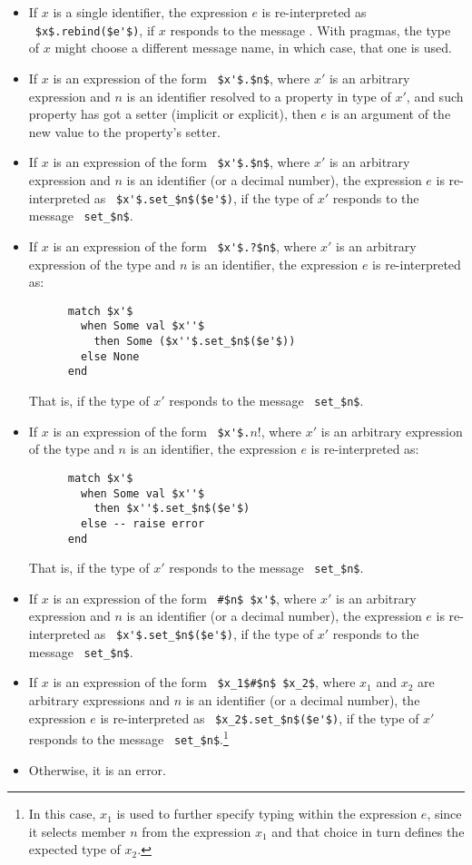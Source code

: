 \begin{itemize}
  \item If $x$ is a single identifier, the expression $e$ is re-interpreted as ~\lstinline!$x$.rebind($e'$)!, if $x$ responds to the message . With pragmas, the type of $x$ might choose a different message name, in which case, that one is used.
  \item If $x$ is an expression of the form ~\lstinline!$x'$.$n$!, where $x'$ is an arbitrary expression and $n$ is an identifier resolved to a property in type of $x'$, and such property has got a setter (implicit or explicit), then $e$ is an argument of the new value to the property's setter.
  \item If $x$ is an expression of the form ~\lstinline!$x'$.$n$!, where $x'$ is an arbitrary expression and $n$ is an identifier (or a decimal number), the expression $e$ is re-interpreted as ~\lstinline!$x'$.set_$n$($e'$)!, if the type of $x'$ responds to the message ~\lstinline!set_$n$!.
  \item If $x$ is an expression of the form ~\lstinline!$x'$.?$n$!, where $x'$ is an arbitrary expression of the type  and $n$ is an identifier, the expression $e$ is re-interpreted as: 
    \begin{lstlisting}
      match $x'$ 
        when Some val $x''$ 
          then Some ($x''$.set_$n$($e'$))
        else None 
      end
    \end{lstlisting} 
    That is, if the type of $x'$ responds to the message ~\lstinline!set_$n$!.
  \item If $x$ is an expression of the form ~\lstinline!$x'$.!$n$!, where $x'$ is an arbitrary expression of the type  and $n$ is an identifier, the expression $e$ is re-interpreted as: 
    \begin{lstlisting}
	  match $x'$ 
	    when Some val $x''$ 
	      then $x''$.set_$n$($e'$)
	    else -- raise error 
	  end
	\end{lstlisting} 
    That is, if the type of $x'$ responds to the message ~\lstinline!set_$n$!.
  \item If $x$ is an expression of the form ~\lstinline!#$n$ $x'$!, where $x'$ is an arbitrary expression and $n$ is an identifier (or a decimal number), the expression $e$ is re-interpreted as ~\lstinline!$x'$.set_$n$($e'$)!, if the type of $x'$ responds to the message ~\lstinline!set_$n$!.
  \item If $x$ is an expression of the form ~\lstinline!$x_1$#$n$ $x_2$!, where $x_1$ and $x_2$ are arbitrary expressions and $n$ is an identifier (or a decimal number), the expression $e$ is re-interpreted as ~\lstinline!$x_2$.set_$n$($e'$)!, if the type of $x'$ responds to the message ~\lstinline!set_$n$!.\footnote{In this case, $x_1$ is used to further specify typing within the expression $e$, since it selects member $n$ from the expression $x_1$ and that choice in turn defines the expected type of $x_2$.}
  \item Otherwise, it is an error. 
\end{itemize}

